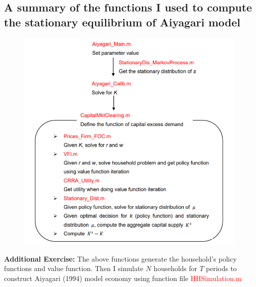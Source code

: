\documentclass{article}
\begin{document}
\begin{spacing}{1.5}
\subsection*{A summary of the functions I used to compute the stationary equilibrium of Aiyagari model}
\begin{figure}[!htb]
\centering
\vspace{-2cm}
\hspace*{2cm}\includegraphics[width=\textwidth,natwidth=450,natheight=430]{readme1.png}\hspace*{-2cm}\\
\end{figure}
\noindent
\textbf{Additional Exercise:} The above functions generate the household's policy functions and value function. Then I simulate $N$ households for $T$ periods to construct Aiyagari (1994) model economy using function file \textcolor{red}{HHSimulation.m}

















\end{spacing}
\end{document}
